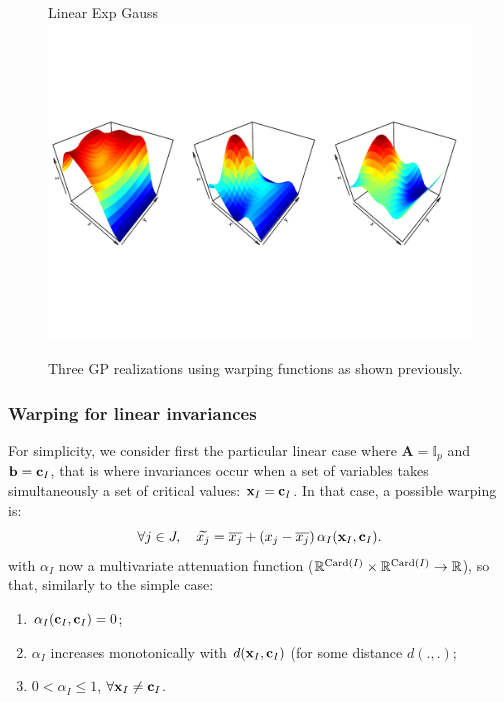 \begin{figure}[!ht]
\centering
Linear \hspace{4cm} Exp \hspace{4cm} Gauss
 \includegraphics[trim=2mm 45mm 2mm 45mm,clip, width=\textwidth]{simu2Dsimple.pdf}
 \caption{Three GP realizations using warping functions as shown previously.}\label{fig:simu2Dsimple}
\end{figure}

\subsubsection{Warping for linear invariances}
For simplicity, we consider first the particular linear case where $\mathbf{A} = \mathbb{I}_p$ and $\mathbf{b}=\mathbf{c}_I$, 
that is where invariances occur when a set of variables takes simultaneously a set of critical values: $\mathbf{x}_I = \mathbf{c}_I$.
In that case, a possible warping is:
\begin{equation}
 \forall j \in J, \quad \widetilde{x_j} = \overline{x_j} + \left( x_j - \overline{x_j}\right) {\alpha_I}(\mathbf{x}_I, \mathbf{c}_I)\label{eq:and}.
\end{equation}
with ${\alpha_I}$ now a multivariate attenuation function ($\mathbb{R}^{\operatorname{Card}(I)} \times \mathbb{R}^{\operatorname{Card}(I)} \rightarrow \mathbb{R}$), so that, similarly to the simple case: 
\begin{enumerate}
 \item $\alpha_I(\mathbf{c}_I, \mathbf{c}_I) = 0$;
 \item $\alpha_I$ increases monotonically with $d(\mathbf{x}_I, \mathbf{c}_I)$ (for some distance $d(.,.)$;
 \item $0 < \alpha_I \leq 1$, $\forall \mathbf{x}_I \neq \mathbf{c}_I$.
\end{enumerate}

